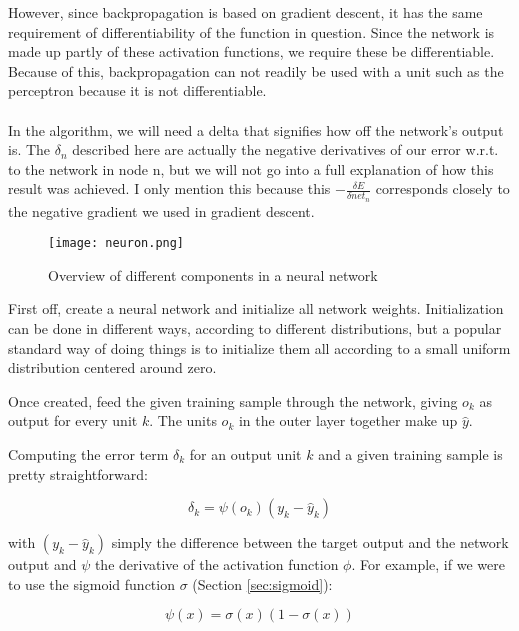 However, since backpropagation is based on gradient descent,
it has the same requirement of differentiability
of the function in question.
Since the network is made up partly of these activation functions,
we require these be differentiable.
Because of this,
backpropagation can not readily be used with a unit such as the perceptron
because it is not differentiable.

\paragraph{}
In the algorithm, we will need a delta
that signifies how off the network's output is.
The $\delta_n$ described here are actually the negative derivatives of our error
w.r.t. to the network in node n,
but we will not go into a full explanation of how this result was achieved.
I only mention this because this
$-\frac{\delta E}{\delta net_n}$
corresponds closely to the negative gradient we used in gradient descent.

\begin{figure}[h]
  \centering
  \texttt{[image: neuron.png]}
  \caption{Overview of different components in a neural network}
  \label{fig:neuron}
\end{figure}

First off, create a neural network
and initialize all network weights.
Initialization can be done in different ways,
according to different distributions,
but a popular standard way of doing things
is to initialize them all according to a small uniform distribution
centered around zero.

Once created, feed the given training sample
through the network, giving $o_k$ as output
for every unit $k$.
The units $o_k$ in the outer layer together
make up $\hat{y}$.

Computing the error term $\delta_k$
for an output unit $k$
and a given training sample
is pretty straightforward:

\begin{equation}
  \delta_k = \psi(o_k) (y_k - \hat{y}_k)
  \label{eq:delta_k}
\end{equation}

with $(y_k - \hat{y}_k)$
simply the difference between the target output and the network output
and $\psi$ the derivative of the activation function $\phi$.
For example, if we were to use
the sigmoid function $\sigma$ (Section \ref{sec:sigmoid}):

\begin{equation}
  \psi(x) = \sigma(x) (1 - \sigma(x))
\end{equation}

